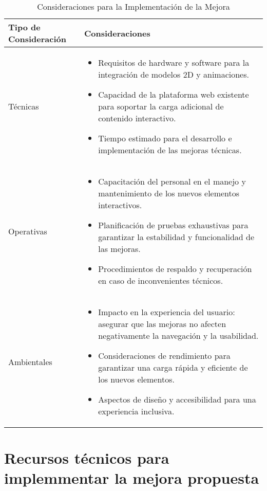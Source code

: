 \newpage
\begin{table}[ht]
\centering
\begin{tabular}{|m{3cm}|m{9cm}|}
\hline
\textbf{Tipo de Consideración} & \textbf{Consideraciones} \\
\hline
Técnicas & \begin{itemize}
             \item Requisitos de hardware y software para la integración de modelos 2D y animaciones.
             \item Capacidad de la plataforma web existente para soportar la carga adicional de contenido interactivo.
             \item Tiempo estimado para el desarrollo e implementación de las mejoras técnicas.
          \end{itemize} \\
\hline
Operativas & \begin{itemize}
                \item Capacitación del personal en el manejo y mantenimiento de los nuevos elementos interactivos.
                \item Planificación de pruebas exhaustivas para garantizar la estabilidad y funcionalidad de las mejoras.
                \item Procedimientos de respaldo y recuperación en caso de inconvenientes técnicos.
             \end{itemize} \\
\hline
Ambientales & \begin{itemize}
                 \item Impacto en la experiencia del usuario: asegurar que las mejoras no afecten negativamente la navegación y la usabilidad.
                 \item Consideraciones de rendimiento para garantizar una carga rápida y eficiente de los nuevos elementos.
                 \item Aspectos de diseño y accesibilidad para una experiencia inclusiva.
              \end{itemize} \\
\hline
\end{tabular}
\caption{Consideraciones para la Implementación de la Mejora}
\end{table}

\newpage

\section{Recursos técnicos para implemmentar la mejora propuesta}

